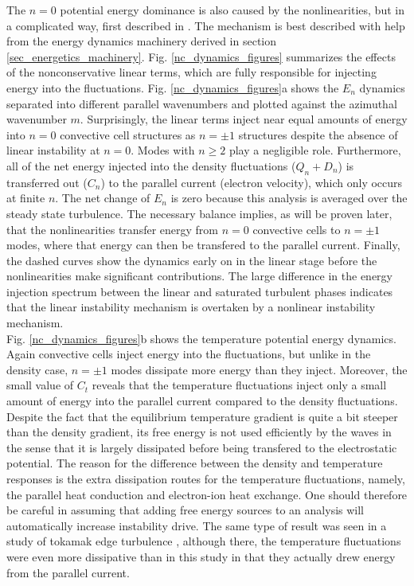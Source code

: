 \documentclass[12pt]{article}
\begin{document}
The $n=0$ potential energy dominance is also caused by the nonlinearities, but in a complicated way, first described in \cite{biskamp1995,drake1995}. The mechanism is best described with
help from the energy dynamics machinery derived in section \ref{sec_energetics_machinery}. Fig. \ref{nc_dynamics_figures} summarizes the effects of the nonconservative linear terms, which are
fully responsible for injecting energy into the fluctuations. Fig. \ref{nc_dynamics_figures}a shows the $E_n$ dynamics separated into different parallel wavenumbers and plotted
against the azimuthal wavenumber $m$. Surprisingly, the linear terms inject near equal amounts of energy into $n=0$ convective cell structures as $n= \pm 1$ structures despite the absence
of linear instability at $n=0$. Modes with $n \ge 2$ play a negligible role. Furthermore, all of the net energy injected into the density fluctuations ($Q_n + D_n$) is transferred out ($C_n$) to
the parallel current (electron velocity), which only occurs at finite $n$. The net change of $E_n$ is zero because this analysis is averaged over the steady state
turbulence. The necessary balance implies, as will be proven later, that the nonlinearities transfer energy from $n=0$ convective cells to $n = \pm 1$ modes, where that energy can then
be transfered to the parallel current.
Finally, the dashed curves show the dynamics early on in the linear stage before the nonlinearities make significant contributions. The large difference in the energy injection spectrum between
the linear and saturated turbulent phases indicates that the linear instability mechanism is overtaken by a nonlinear instability mechanism. \\

Fig. \ref{nc_dynamics_figures}b shows the temperature potential energy dynamics. Again convective cells inject energy into the fluctuations, but unlike in the density case, $n = \pm 1$ modes
dissipate more energy than they inject. Moreover, the small value of $C_t$ reveals that the temperature fluctuations inject only a small amount of energy into the parallel current compared
to the density fluctuations. Despite the fact that the equilibrium temperature gradient is quite a bit steeper than the density gradient, its free energy is not used efficiently by the waves
in the sense that it is largely dissipated before being transfered to the electrostatic potential. The reason for the difference
between the density and temperature responses is the extra dissipation routes for the temperature fluctuations, namely, the parallel heat conduction and electron-ion heat exchange.
One should therefore be careful in assuming that adding free energy sources to an analysis will automatically increase instability drive.
The same type of result was seen in a study of tokamak edge turbulence \cite{zeiler1997}, although there, the temperature fluctuations were even more dissipative than in this study in that they
actually drew energy from the parallel current. \\
\end{document}
